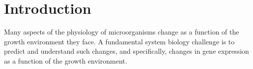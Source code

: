 \section{Introduction}
Many aspects of the physiology of microorganisms change as a function of the growth environment they face.
A fundamental system biology challenge is to predict and understand such changes, and specifically, changes in gene expression as a function of the growth environment.